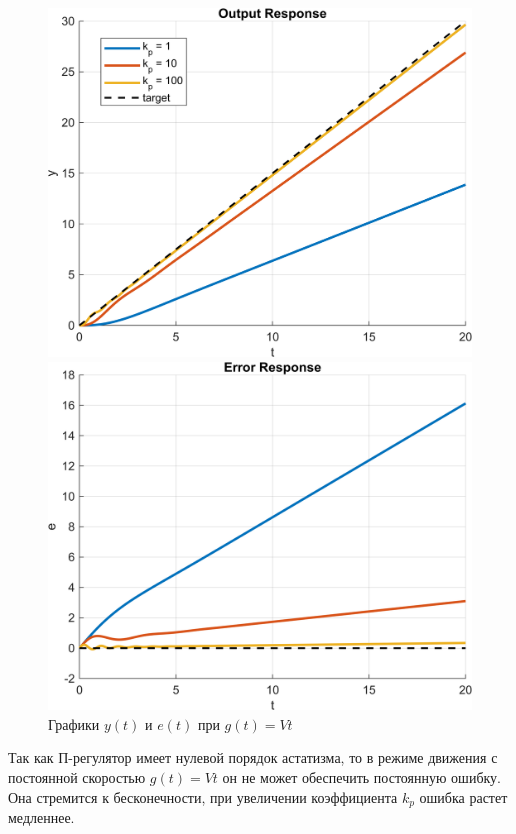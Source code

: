 \begin{figure}[H]
    \centering
    \begin{minipage}{0.45\textwidth}
        \centering
        \includegraphics[width=1\textwidth, trim={1cm 0cm 1cm 0cm}]{../images/3_3.png}
    \end{minipage}
    \hfill
    \begin{minipage}{0.45\textwidth}
        \centering
        \includegraphics[width=1\textwidth, trim={1cm 0cm 1cm 0cm}]{../images/3_4.png}
    \end{minipage}
    \caption{Графики $y(t)$ и $e(t)$ при $g(t) = Vt$}
\end{figure}

Так как П-регулятор имеет нулевой порядок астатизма, 
то в режиме движения с постоянной скоростью $g(t) = Vt$
он не может обеспечить постоянную ошибку.
Она стремится к бесконечности, при увеличении 
коэффициента $k_p$ ошибка растет медленнее.
\endinput